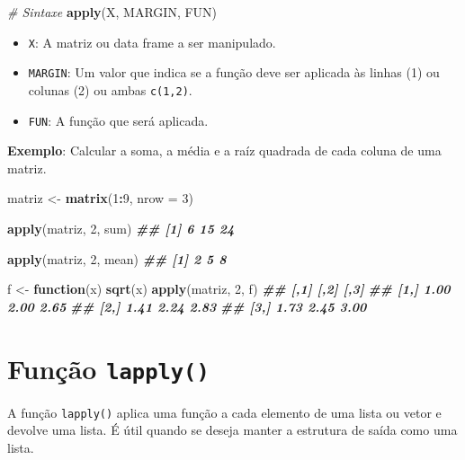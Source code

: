 \documentclass[
]{book}
\newenvironment{Shaded}{\begin{snugshade}}{\end{snugshade}}
\newcommand{\AttributeTok}[1]{\textcolor[rgb]{0.13,0.29,0.53}{#1}}
\newcommand{\CommentTok}[1]{\textcolor[rgb]{0.56,0.35,0.01}{\textit{#1}}}
\newcommand{\ControlFlowTok}[1]{\textcolor[rgb]{0.13,0.29,0.53}{\textbf{#1}}}
\newcommand{\DecValTok}[1]{\textcolor[rgb]{0.00,0.00,0.81}{#1}}
\newcommand{\DocumentationTok}[1]{\textcolor[rgb]{0.56,0.35,0.01}{\textbf{\textit{#1}}}}
\newcommand{\FunctionTok}[1]{\textcolor[rgb]{0.13,0.29,0.53}{\textbf{#1}}}
\newcommand{\NormalTok}[1]{#1}
\newcommand{\OtherTok}[1]{\textcolor[rgb]{0.56,0.35,0.01}{#1}}
\newcommand{\SpecialCharTok}[1]{\textcolor[rgb]{0.81,0.36,0.00}{\textbf{#1}}}
\begin{document}
\begin{Shaded}
\begin{Highlighting}[]
\CommentTok{\# Sintaxe}
\FunctionTok{apply}\NormalTok{(X, MARGIN, FUN)}
\end{Highlighting}
\end{Shaded}

\begin{itemize}
\item
  \texttt{X}: A matriz ou data frame a ser manipulado.
\item
  \texttt{MARGIN}: Um valor que indica se a função deve ser aplicada às
  linhas (1) ou colunas (2) ou ambas \texttt{c(1,2)}.
\item
  \texttt{FUN}: A função que será aplicada.
\end{itemize}

\textbf{Exemplo}: Calcular a soma, a média e a raíz quadrada de cada coluna
de uma matriz.

\begin{Shaded}
\begin{Highlighting}[]
\NormalTok{matriz }\OtherTok{\textless{}{-}} \FunctionTok{matrix}\NormalTok{(}\DecValTok{1}\SpecialCharTok{:}\DecValTok{9}\NormalTok{, }\AttributeTok{nrow =} \DecValTok{3}\NormalTok{)}

\FunctionTok{apply}\NormalTok{(matriz, }\DecValTok{2}\NormalTok{, sum)}
\DocumentationTok{\#\# [1]  6 15 24}

\FunctionTok{apply}\NormalTok{(matriz, }\DecValTok{2}\NormalTok{, mean)}
\DocumentationTok{\#\# [1] 2 5 8}

\NormalTok{f }\OtherTok{\textless{}{-}} \ControlFlowTok{function}\NormalTok{(x) }\FunctionTok{sqrt}\NormalTok{(x)}
\FunctionTok{apply}\NormalTok{(matriz, }\DecValTok{2}\NormalTok{, f)}
\DocumentationTok{\#\#      [,1] [,2] [,3]}
\DocumentationTok{\#\# [1,] 1.00 2.00 2.65}
\DocumentationTok{\#\# [2,] 1.41 2.24 2.83}
\DocumentationTok{\#\# [3,] 1.73 2.45 3.00}
\end{Highlighting}
\end{Shaded}

\section{\texorpdfstring{Função \texttt{lapply()}}{Função lapply()}}\label{funuxe7uxe3o-lapply}

A função \texttt{lapply()} aplica uma função a cada elemento de uma lista ou
vetor e devolve uma lista. É útil quando se deseja manter a estrutura de
saída como uma lista.
\end{document}
